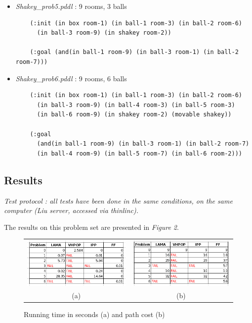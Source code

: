 \begin{itemize}
\begin{verbatim}
    (:goal (in ball-1 room-9))
  \end{verbatim}
  \item \textit{Shakey\_prob5.pddl} : 9 rooms, 3 balls
  \vspace*{1em}
  \begin{verbatim}
    (:init (in box room-1) (in ball-1 room-3) (in ball-2 room-6)
      (in ball-3 room-9) (in shakey room-2))

    (:goal (and(in ball-1 room-9) (in ball-3 room-1) (in ball-2 room-7)))
  \end{verbatim}
  \item \textit{Shakey\_prob6.pddl} : 9 rooms, 6 balls
  \vspace*{1em}
  \begin{verbatim}
    (:init (in box room-1) (in ball-1 room-3) (in ball-2 room-6)
      (in ball-3 room-9) (in ball-4 room-3) (in ball-5 room-3)
      (in ball-6 room-9) (in shakey room-2) (movable shakey))

    (:goal
      (and(in ball-1 room-9) (in ball-3 room-1) (in ball-2 room-7)
      (in ball-4 room-9) (in ball-5 room-7) (in ball-6 room-2)))
  \end{verbatim}
\end{itemize}
\newpage
\subsection*{Results}
\thispagestyle{empty}
\textit{Test protocol : all tests have been done in the same conditions, on
the same computer (Liu server, accessed via thinlinc).}
\thispagestyle{empty}

The results on this problem set are presented in \textit{Figure 2}.

\begin{figure}[h]
    \centering
    \begin{tabular}{cc}
      \includegraphics[width=.49\linewidth,scale=1]{./images/tab1.png} & \includegraphics[width=.49\linewidth, scale=1.5]{./images/tab2.png} \\
      (a) & (b)
    \end{tabular}
    \caption{Running time in seconds (a) and path cost (b)}
\end{figure}
